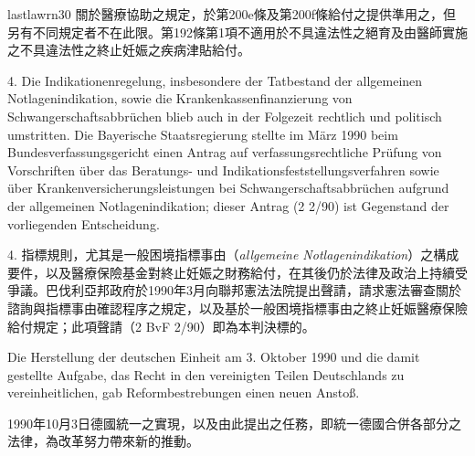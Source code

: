 \documentclass[12pt]{article}
\begin{document}
\begin{transboxpara}
\begin{lawboxpart}{last}{lawrn30}
關於醫療協助之規定，於第200e條及第200f條給付之提供準用之，但另有不同規定者不在此限。第192條第1項不適用於不具違法性之絕育及由醫師實施之不具違法性之終止妊娠之疾病津貼給付。
\end{lawboxpart}
\end{transboxpara}

\begin{sourcepara}[title={原文理由 A.I.4}]
4. Die Indikationenregelung, insbesondere der Tatbestand der allgemeinen Notlagenindikation, sowie die Krankenkassenfinanzierung von Schwangerschaftsabbrüchen blieb auch in der Folgezeit rechtlich und politisch umstritten. Die Bayerische Staatsregierung stellte im März 1990 beim Bundesverfassungsgericht einen Antrag auf verfassungsrechtliche Prüfung von Vorschriften über das Beratungs- und Indikationsfeststellungsverfahren sowie über Krankenversicherungsleistungen bei Schwangerschaftsabbrüchen aufgrund der allgemeinen Notlagenindikation; dieser Antrag (2 \abbrBvF{} 2/90) ist Gegenstand der vorliegenden Entscheidung.
\end{sourcepara}
\begin{transpara}
4. 指標規則，尤其是一般困境指標事由（\textit{allgemeine Notlagenindikation}）之構成要件，以及醫療保險基金對終止妊娠之財務給付，在其後仍於法律及政治上持續受爭議。巴伐利亞邦政府於1990年3月向聯邦憲法法院提出聲請，請求憲法審查關於諮詢與指標事由確認程序之規定，以及基於一般困境指標事由之終止妊娠醫療保險給付規定；此項聲請（2 BvF 2/90）即為本判決標的。
\end{transpara}


\begin{sourcepara}[title={原文理由 A.II}]
Die Herstellung der deutschen Einheit am 3. Oktober 1990 und die damit gestellte Aufgabe, das Recht in den vereinigten Teilen Deutschlands zu vereinheitlichen, gab Reformbestrebungen einen neuen Anstoß.
\end{sourcepara}
\begin{transpara}
1990年10月3日德國統一之實現，以及由此提出之任務，即統一德國合併各部分之法律，為改革努力帶來新的推動。
\end{transpara}
\end{document}
